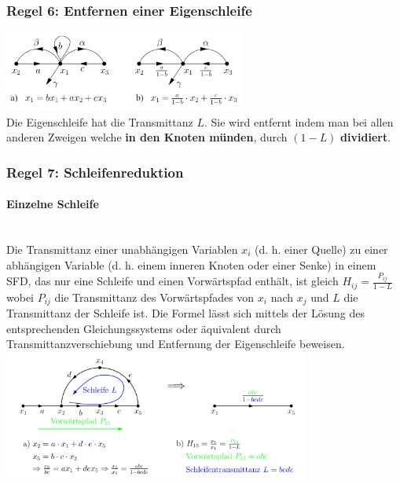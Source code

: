 \begin{multicols}{2}
	      \subsubsection{Regel 6: Entfernen einer Eigenschleife }
	        \includegraphics[width=8cm]{./bilder/eigenschleife.png} \\
	        Die Eigenschleife hat die Transmittanz $L$. Sie wird entfernt indem man bei allen anderen
	        Zweigen welche \textbf{in den Knoten münden}, durch $(1-L)$ \textbf{dividiert}.
	        
	      \subsubsection{Regel 7: Schleifenreduktion }
		      \paragraph{Einzelne Schleife} \ \\
			      Die Transmittanz einer unabhängigen Variablen $x_i$ (d. h. einer Quelle) zu einer abhängigen Variable (d. h. einem inneren Knoten oder einer Senke) in einem SFD, das nur eine Schleife und einen Vorwärtspfad enthält, ist gleich $H_{ij}=\frac{P_{ij}}{1-L}$ wobei $P_{ij}$ die Transmittanz des Vorwärtspfades von $x_i$ nach $x_j$ und $L$ die Transmittanz der Schleife ist. Die Formel lässt sich mittels der Lösung des entsprechenden Gleichungssystems oder äquivalent durch Transmittanzverschiebung und Entfernung der Eigenschleife beweisen. \\
			      \includegraphics[width=10cm]{./bilder/schleifenreduktion_einzelneschleife.png}
			      

\end{multicols}
